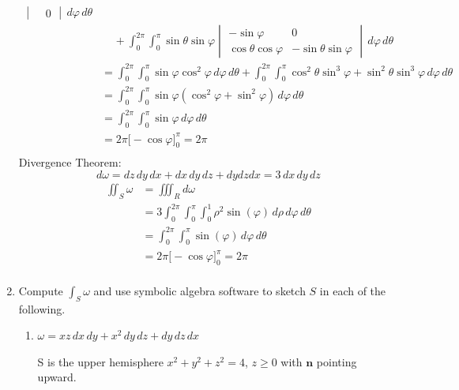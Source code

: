 \documentclass{article}
\begin{document}
\begin{enumerate}
\begin{align*}
\begin{vmatrix}
        & 0 \end{vmatrix}\, d\varphi \, d\theta \\
        & \; \; \; \; 
        + \int_0^{2\pi} \int_0^{\pi} \sin\theta \sin\varphi 
        \begin{vmatrix} -\sin \varphi 
        & 0 \\ \cos \theta \cos \varphi 
        & - \sin \theta \sin \varphi \end{vmatrix}\, d\varphi \, d\theta \\
        &= \int_0^{2\pi} \int_0^{\pi} 
        \sin \varphi \cos^2 \varphi \, d\varphi \, d\theta 
        + \int_0^{2\pi} \int_0^{\pi} \cos^2\theta \sin^3\varphi 
        + \sin^2\theta \sin^3\varphi \, d\varphi \, d\theta \\
        &= \int_0^{2\pi} \int_0^{\pi} \sin \varphi (\cos^2 \varphi 
        + \sin^2 \varphi) \, d\varphi \, d\theta  \\
        &= \int_0^{2\pi} \int_0^{\pi} \sin \varphi  \, d\varphi \, d\theta  \\
        &= 2\pi \bigg[ -\cos \varphi\bigg]_0^{\pi} = 2\pi \\
    \end{align*}
    Divergence Theorem:
    \[ d\omega = dz \, dy \, dx 
    + dx \, dy \, dz + dy dz dx = 3 \, dx \, dy \, dz \]
    \begin{align*}
        \iint_S \omega &= \iiint_R d \omega \\
        &= 3 \int_0^{2\pi} \int_0^{\pi} \int_0^1 
        \rho^2 \sin(\varphi) \, d\rho \, d\varphi \, d\theta \\
        &= \int_0^{2\pi} \int_0^{\pi} \sin(\varphi) \, d\varphi \, d\theta \\
        &= 2\pi \bigg[ -\cos \varphi\bigg]_0^{\pi} = 2\pi \\
    \end{align*}

    \newpage
    \item Compute $\displaystyle \int_S \omega$ and use symbolic algebra 
    software to sketch $S$ in each of the following.
    \begin{enumerate}
        \item $\omega = xz \, dx \, dy + x^2 \, dy \, dz + dy \, dz \, dx$
  
        S is the upper hemisphere $x^2 + y^2 + z^2 = 4$, $z \geq 0$ with 
        $\boldsymbol n$ pointing upward.
        

\end{enumerate}
\end{enumerate}
\end{document}

